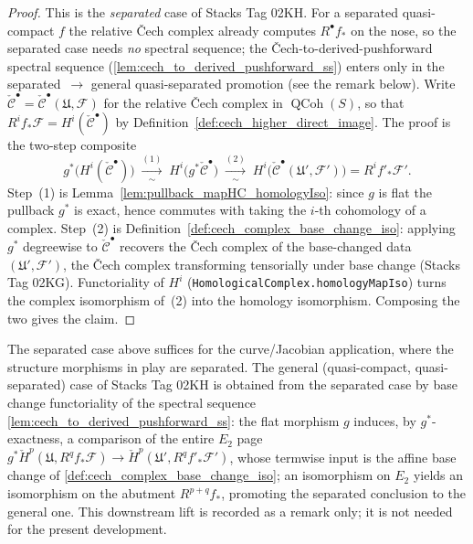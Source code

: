 \begin{proof}
  This is the \emph{separated} case of Stacks Tag 02KH. For a separated quasi-compact
  \(f\) the relative {\v C}ech complex already computes \(R^\bullet f_*\) on the nose,
  so the separated case needs \emph{no} spectral sequence; the
  {\v C}ech-to-derived-pushforward spectral sequence
  (\cref{lem:cech_to_derived_pushforward_ss}) enters only in the
  separated~\(\to\) general quasi-separated promotion (see the remark below). Write
  \(\check{\mathcal{C}}^\bullet = \check{\mathcal{C}}^\bullet(\mathfrak{U},\mathcal{F})\)
  for the relative {\v C}ech complex in \(\operatorname{QCoh}(S)\), so that
  \(R^i f_*\mathcal{F} = H^i(\check{\mathcal{C}}^\bullet)\) by
  Definition~\ref{def:cech_higher_direct_image}. The proof is the two-step composite
  \[
    g^*\bigl(H^i(\check{\mathcal{C}}^\bullet)\bigr)
      \;\xrightarrow[\ \sim\ ]{(1)}\;
    H^i\bigl(g^*\check{\mathcal{C}}^\bullet\bigr)
      \;\xrightarrow[\ \sim\ ]{(2)}\;
    H^i\bigl(\check{\mathcal{C}}^\bullet(\mathfrak{U}', \mathcal{F}')\bigr)
      = R^i f'_*\mathcal{F}'.
  \]
  Step~(1) is Lemma~\ref{lem:pullback_mapHC_homologyIso}: since \(g\) is flat the
  pullback \(g^*\) is exact, hence commutes with taking the \(i\)-th cohomology of a
  complex. Step~(2) is Definition~\ref{def:cech_complex_base_change_iso}: applying
  \(g^*\) degreewise to \(\check{\mathcal{C}}^\bullet\) recovers the {\v C}ech complex
  of the base-changed data \((\mathfrak{U}', \mathcal{F}')\), the {\v C}ech complex
  transforming tensorially under base change (Stacks Tag 02KG). Functoriality of
  \(H^i\) (\texttt{HomologicalComplex.homologyMapIso}) turns the complex isomorphism
  of~(2) into the homology isomorphism. Composing the two gives the claim.
\end{proof}

\begin{remark}
  \label{rem:cech_flat_base_change_general}
  The separated case above suffices for the curve/Jacobian application, where the
  structure morphisms in play are separated. The general (quasi-compact,
  quasi-separated) case of Stacks Tag 02KH is obtained from the separated case by base
  change functoriality of the spectral sequence
  \cref{lem:cech_to_derived_pushforward_ss}: the flat morphism \(g\) induces, by
  \(g^*\)-exactness, a comparison of the entire \(E_2\) page
  \(g^*\check{H}^p(\mathfrak{U}, R^q f_*\mathcal{F}) \to
  \check{H}^p(\mathfrak{U}', R^q f'_*\mathcal{F}')\), whose termwise input is the affine
  base change of \cref{def:cech_complex_base_change_iso}; an isomorphism on \(E_2\)
  yields an isomorphism on the abutment \(R^{p+q} f_*\), promoting the separated
  conclusion to the general one. This downstream lift is recorded as a remark only; it
  is not needed for the present development.
\end{remark}

